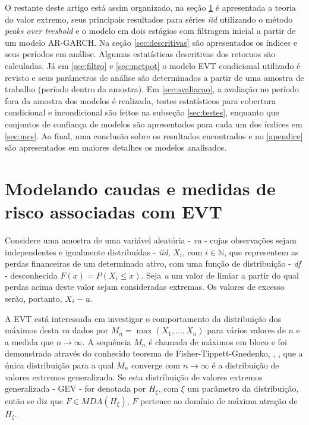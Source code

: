 \documentclass[1p]{elsarticle}
\theoremstyle{definition}
\begin{document}
O restante deste artigo está assim organizado, na seção \ref{sec:caudas} é apresentada a teoria do valor extremo, seus principais resultados para séries \emph{iid} utilizando o método \emph{peaks over treshold} e o modelo em dois estágios com filtragem inicial a partir de um modelo AR-GARCH. Na seção \ref{sec:descritivas} são apresentados os índices e seus períodos em análise. Algumas estatísticas descritivas dos retornos são calculadas. Já em \ref{sec:filtro} e \ref{sec:metpot} o modelo EVT condicional utilizado é revisto e seus parâmetros de análise são determinados a partir de uma amostra de trabalho (período dentro da amostra). Em \ref{sec:avaliacao}, a avaliação no período fora da amostra dos modelos é realizada, testes estatísticos para cobertura condicional e incondicional são feitos na subseção \ref{sec:testes}, enquanto que conjuntos de confiança de modelos são apresentados para cada um dos índices em \ref{sec:mcs}. Ao final, uma conclusão sobre os resultados encontrados e no \ref{apendice} são apresentados em maiores detalhes os modelos analisados.

\section{Modelando caudas e medidas de risco associadas com EVT}
\label{sec:caudas}

Considere uma amostra de uma variável aleatória - \emph{va} - cujas observações sejam independentes e igualmente distribuídas - \emph{iid}, $X_i$, com $i\in \mathbb{N}$, que representem as perdas financeiras de um determinado ativo, com uma função de distribuição - \emph{df} - desconhecida $F(x) = P(X_i \leq x)$.
Seja \emph{u} um valor de limiar a partir do qual perdas acima deste valor sejam consideradas extremas. Os valores de excesso serão, portanto, $X_i - \emph{u}$.

A EVT está interessada em investigar o comportamento da distribuição dos máximos desta \emph{va} dados por $M_n = \max (X_1, \ldots , X_n)$ para vários valores de $n$ e a medida que $n\rightarrow \infty$. A sequência $M_n$ é chamada de máximos em bloco e foi demonstrado através do conhecido teorema de Fisher-Tippett-Gnedenko, \cite{Fisher1928}, \cite{Gnedenko1941, Gnedenko1943}, que a única distribuição para a qual $M_n$ converge com $n\rightarrow \infty$ é a distribuição de valores extremos generalizada. Se esta distribuição de valores extremos generalizada - GEV - for denotada por $H_\xi$, com $\xi$ um parâmetro da distribuição, então se diz que $F \in MDA(H_\xi)$, $F$ pertence ao domínio de máxima atração de $H_\xi$.
\end{document}
